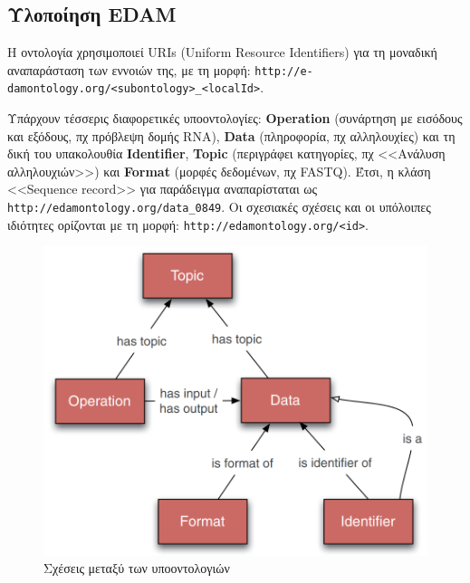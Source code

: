     \subsection{Υλοποίηση EDAM}
        Η οντολογία χρησιμοποιεί URIs (Uniform Resource Identifiers) για τη μοναδική αναπαράσταση των εννοιών της, με τη μορφή: \verb|http://e-damontology.org/<subontology>_<localId>|.

        Υπάρχουν τέσσερις διαφορετικές υποοντολογίες: \textbf{Operation} (συνάρτηση με εισόδους και εξόδους, πχ πρόβλεψη δομής RNA), \textbf{Data} (πληροφορία, πχ αλληλουχίες) και τη δική του υπακολουθία \textbf{Identifier}, \textbf{Topic} (περιγράφει κατηγορίες, πχ <<Ανάλυση αλληλουχιών>>) και \textbf{Format} (μορφές δεδομένων, πχ FASTQ).
        Έτσι, η κλάση <<Sequence record>> για παράδειγμα αναπαρίσταται ως \verb|http://edamontology.org/data_0849|. \linebreak
        Οι σχεσιακές σχέσεις και οι υπόλοιπες ιδιότητες ορίζονται με τη μορφή: \verb|http://edamontology.org/<id>|.

        \begin{figure}[h!] \noindent\centering
            \includegraphics[scale=0.4]{img/Edam subontologies}
            \caption{Σχέσεις μεταξύ των υποοντολογιών \cite{EDAMpaper}}
        \end{figure}


